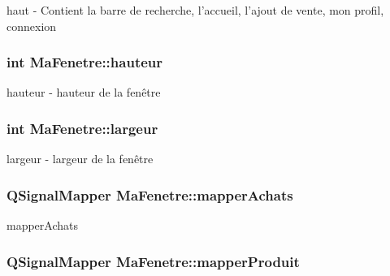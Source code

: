 haut -\/ Contient la barre de recherche, l'accueil, l'ajout de vente, mon profil, connexion 

\hypertarget{class_ma_fenetre_ae1a802d46705239d08d3bf06cd99b802}{
\subsubsection[{hauteur}]{\setlength{\rightskip}{0pt plus 5cm}int Ma\-Fenetre\-::hauteur\hspace{0.3cm}{\ttfamily [protected]}}}\label{class_ma_fenetre_ae1a802d46705239d08d3bf06cd99b802}


hauteur -\/ hauteur de la fenêtre 

\hypertarget{class_ma_fenetre_abe37db89fd8895cc34ccc0f5cda67aaf}{
\subsubsection[{largeur}]{\setlength{\rightskip}{0pt plus 5cm}int Ma\-Fenetre\-::largeur\hspace{0.3cm}{\ttfamily [protected]}}}\label{class_ma_fenetre_abe37db89fd8895cc34ccc0f5cda67aaf}


largeur -\/ largeur de la fenêtre 

\hypertarget{class_ma_fenetre_aec38227203ed7fa15ad565077697d661}{
\subsubsection[{mapper\-Achats}]{\setlength{\rightskip}{0pt plus 5cm}Q\-Signal\-Mapper Ma\-Fenetre\-::mapper\-Achats\hspace{0.3cm}{\ttfamily [protected]}}}\label{class_ma_fenetre_aec38227203ed7fa15ad565077697d661}


mapper\-Achats 

\hypertarget{class_ma_fenetre_a7345ec3b89dedf18ae6297d77c5653b4}{
\subsubsection[{mapper\-Produit}]{\setlength{\rightskip}{0pt plus 5cm}Q\-Signal\-Mapper Ma\-Fenetre\-::mapper\-Produit\hspace{0.3cm}{\ttfamily [protected]}}}\label{class_ma_fenetre_a7345ec3b89dedf18ae6297d77c5653b4}


